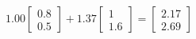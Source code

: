\documentclass[preview]{standalone}
\begin{document}
\begin{align*}
1.00 \begin{bmatrix} 0.8 \\ 0.5 \end{bmatrix} + 1.37 \begin{bmatrix} 1 \\ 1.6 \end{bmatrix} = \begin{bmatrix} 2.17 \\ 2.69 \end{bmatrix}
\end{align*}
\end{document}
